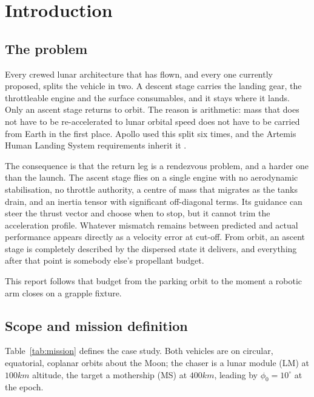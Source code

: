 \section{Introduction}

\subsection{The problem}

Every crewed lunar architecture that has flown, and every one currently
proposed, splits the vehicle in two. A descent stage carries the landing gear,
the throttleable engine and the surface consumables, and it stays where it
lands. Only an ascent stage returns to orbit. The reason is arithmetic: mass
that does not have to be re-accelerated to lunar orbital speed does not have to
be carried from Earth in the first place. Apollo used this split six times, and
the Artemis Human Landing System requirements inherit it \cite{nasa_artemis}.

The consequence is that the return leg is a rendezvous problem, and a harder one
than the launch. The ascent stage flies on a single engine with no aerodynamic
stabilisation, no throttle authority, a centre of mass that migrates as the
tanks drain, and an inertia tensor with significant off-diagonal terms. Its
guidance can steer the thrust vector and choose when to stop, but it cannot trim
the acceleration profile. Whatever mismatch remains between predicted and actual
performance appears directly as a velocity error at cut-off. From orbit, an
ascent stage is completely described by the dispersed state it delivers, and
everything after that point is somebody else's propellant budget.

This report follows that budget from the parking orbit to the moment a robotic
arm closes on a grapple fixture.

\subsection{Scope and mission definition}

Table~\ref{tab:mission} defines the case study. Both vehicles are on circular,
equatorial, coplanar orbits about the Moon; the chaser is a lunar module (LM) at
$100\unit{km}$ altitude, the target a mothership (MS) at $400\unit{km}$, leading
by $\phi_0 = 10^\circ$ at the epoch.

